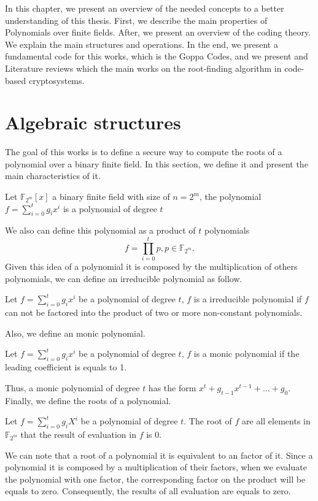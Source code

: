 In this chapter, we present an overview of the needed concepts to a better understanding of this thesis. First, we describe the main properties of Polynomials over finite fields. After, we present an overview of the coding theory. We explain the main structures and operations. In the end, we present a fundamental code for this works, which is the Goppa Codes, and we present and Literature reviews which the main works on the root-finding algorithm in code-based cryptosystems. 

\section{Algebraic structures}
The goal of this works is to define a secure way to compute the roots of a polynomial over a binary finite field. In this section, we define it and present the main characteristics of it.
\begin{definition}
Let $\mathbb{F}_{2^m}[x]$ a binary finite field with size of $n=2^m$, the polynomial $f = \sum_{i=0}^{t}{g_{i}x^{i}}$ is a polynomial of degree $t$
\end{definition}
We also can define this polynomial as a product of $t$ polynomials
\begin{equation*}
    f = \prod_{i=0}^{t}{p}, p \in \mathbb{F}_{2^m}.
\end{equation*}
Given this idea of a polynomial it is composed by the multiplication of others polynomials, we can define an irreducible polynomial as follow.
\begin{definition}
Let $f = \sum_{i=0}^{t}{g_{i}x^{i}}$ be a polynomial of degree $t$, $f$ is a irreducible polynomial if $f$ can not be factored into the product of two or more non-constant polynomials.
\end{definition}
Also, we define an monic polynomial.
\begin{definition}
Let $f = \sum_{i=0}^{t}{g_{i}x^{i}}$ be a polynomial of degree $t$, $f$ is a monic polynomial if the leading coefficient is equals to 1. 
\end{definition}
Thus, a monic polynomial of degree $t$ has the form $x^t + g_{t-1}x^{t-1} + \dots + g_0$. Finally, we define the roots of a polynomial.
\begin{definition}
Let $f = \sum_{i=0}^{t}{g_{i}X^{i}}$ be a polynomial of degree $t$. The root of $f$ are all elements in $\mathbb{F}_{2^m}$ that the result of evaluation in $f$ is 0.
\end{definition}
We can note that a root of a polynomial it is equivalent to an factor of it. Since a polynomial it is composed by a multiplication of their factors, when we evaluate the polynomial with one factor, the corresponding factor on the product will be equals to zero. Consequently, the results of all evaluation are equals to zero.


